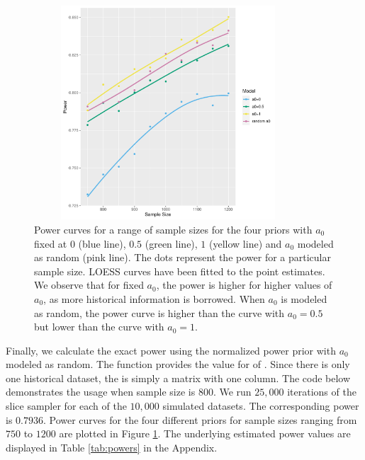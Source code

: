 \begin{figure}

\centering
\includegraphics[width=10cm, height=8cm]{glm_powers}
\caption{Power curves for a range of sample sizes for the four priors with $a_0$ fixed at $0$ (blue line), $0.5$ (green line), $1$ (yellow line) and $a_0$ modeled as random (pink line). The dots represent the power for a particular sample size. LOESS curves have been fitted to the point estimates. We observe that for fixed $a_0$, the power is higher for higher values of $a_0$, as more historical information is borrowed. When $a_0$ is modeled as random, the power curve is higher than the curve with $a_0=0.5$ but lower than the curve with $a_0=1$.}
\label{powerplot}
\end{figure}


Finally, we calculate the exact power using the normalized power prior with $a_0$ modeled as random. The  function provides the value for  of . Since there is only one historical dataset, the  is simply a matrix with one column. The code below demonstrates the usage when sample size is $800$. We run $25,000$ iterations of the slice sampler for each of the $10,000$ simulated datasets. The corresponding power is $0.7936$. Power curves for the four different priors for sample sizes ranging from $750$ to $1200$ are plotted in Figure \ref{powerplot}. The underlying estimated power values are displayed in Table \ref{tab:powers} in the Appendix. 







